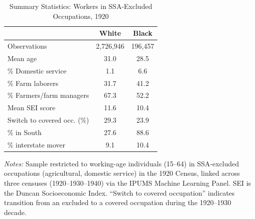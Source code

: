 \begin{table}[t]
\centering
\caption{Summary Statistics: Workers in SSA-Excluded Occupations, 1920}
\label{tab:summary}
\begin{tabular}{lcc}
\hline\hline
 & White & Black \\
\hline
Observations & 2,726,946 & 196,457 \\
Mean age & 31.0 & 28.5 \\
\% Domestic service & 1.1 & 6.6 \\
\% Farm laborers & 31.7 & 41.2 \\
\% Farmers/farm managers & 67.3 & 52.2 \\
Mean SEI score & 11.6 & 10.4 \\
Switch to covered occ. (\%) & 29.3 & 23.9 \\
\% in South & 27.6 & 88.6 \\
\% interstate mover & 9.1 & 10.4 \\
\hline\hline
\end{tabular}
\begin{tablenotes}
\small
\item \textit{Notes:} Sample restricted to working-age individuals (15--64) in SSA-excluded occupations (agricultural, domestic service) in the 1920 Census, linked across three censuses (1920--1930--1940) via the IPUMS Machine Learning Panel. SEI is the Duncan Socioeconomic Index. ``Switch to covered occupation'' indicates transition from an excluded to a covered occupation during the 1920--1930 decade.
\end{tablenotes}
\end{table}
